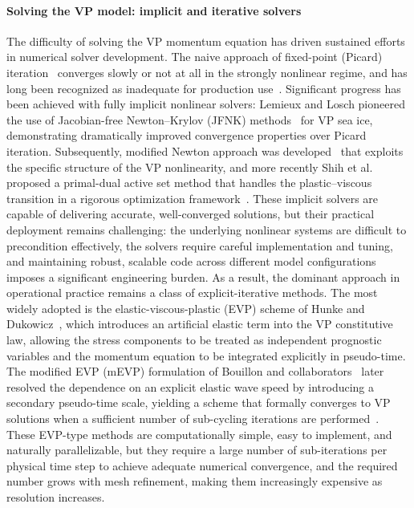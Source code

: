 \documentclass[11pt]{article}
\begin{document}
\paragraph{Solving the VP model: implicit and iterative solvers}
The difficulty of solving the VP momentum equation has driven sustained efforts in numerical solver development. The naive approach of fixed-point (Picard) iteration~\cite{ZhangHibler1997} converges slowly or not at all in the strongly nonlinear regime, and has long been recognized as inadequate for production use~\cite{LemieuxTremblay2009}. Significant progress has been achieved with fully implicit nonlinear solvers: Lemieux and Losch pioneered the use of Jacobian-free Newton–Krylov (JFNK) methods~\cite{Lemieux2012,Losch2014} for VP sea ice, demonstrating dramatically improved convergence properties over Picard iteration. Subsequently, modified Newton approach was developed~\cite{Mehlmann2017} that exploits the specific structure of the VP nonlinearity, and more recently Shih et al. proposed a primal-dual active set method that handles the plastic–viscous transition in a rigorous optimization framework~\cite{Shih2023}. These implicit solvers are capable of delivering accurate, well-converged solutions, but their practical deployment remains challenging: the underlying nonlinear systems are difficult to precondition effectively, the solvers require careful implementation and tuning, and maintaining robust, scalable code across different model configurations imposes a significant engineering burden. As a result, the dominant approach in operational practice remains a class of explicit-iterative methods. The most widely adopted is the elastic-viscous-plastic (EVP) scheme of Hunke and Dukowicz~\cite{HunkeDukowicz1997}, which introduces an artificial elastic term into the VP constitutive law, allowing the stress components to be treated as independent prognostic variables and the momentum equation to be integrated explicitly in pseudo-time. The modified EVP (mEVP) formulation of Bouillon and collaborators~\cite{Bouillon2013} later resolved the dependence on an explicit elastic wave speed by introducing a secondary pseudo-time scale, yielding a scheme that formally converges to VP solutions when a sufficient number of sub-cycling iterations are performed~\cite{Kimmritz2016,Kimmritz2017}. These EVP-type methods are computationally simple, easy to implement, and naturally parallelizable, but they require a large number of sub-iterations per physical time step to achieve adequate numerical convergence, and the required number grows with mesh refinement, making them increasingly expensive as resolution increases.
\end{document}
